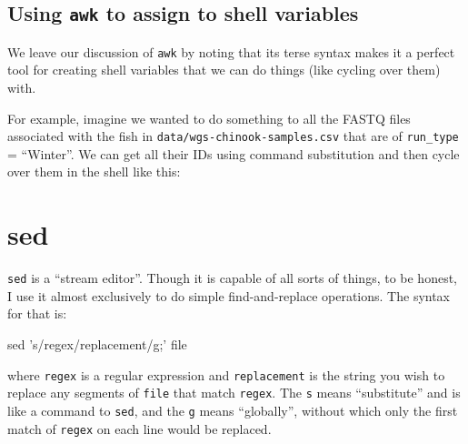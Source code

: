 \documentclass[]{krantz}
\makeatletter
\newenvironment{Shaded}{\begin{snugshade}}{\end{snugshade}}
\newcommand{\BuiltInTok}[1]{#1}
\newcommand{\ExtensionTok}[1]{#1}
\newcommand{\FunctionTok}[1]{\textcolor[rgb]{0,0,0}{#1}}
\newcommand{\KeywordTok}[1]{\textcolor[rgb]{0.27,0.27,0.27}{\textbf{#1}}}
\newcommand{\NormalTok}[1]{#1}
\newcommand{\StringTok}[1]{\textcolor[rgb]{0.5,0.5,0.5}{#1}}
\newcommand{\VariableTok}[1]{\textcolor[rgb]{0,0,0}{#1}}
\newenvironment{kframe}{%
\medskip{}
\setlength{\fboxsep}{.8em}
 \def\at@end@of@kframe{}%
 \ifinner\ifhmode%
  \def\at@end@of@kframe{\end{minipage}}%
  \begin{minipage}{\columnwidth}%
 \fi\fi%
 \def\FrameCommand##1{\hskip\@totalleftmargin \hskip-\fboxsep
 \colorbox{shadecolor}{##1}\hskip-\fboxsep
     \hskip-\linewidth \hskip-\@totalleftmargin \hskip\columnwidth}%
 \MakeFramed {\advance\hsize-\width
   \@totalleftmargin\z@ \linewidth\hsize
   \@setminipage}}%
 {\par\unskip\endMakeFramed%
 \at@end@of@kframe}
\renewenvironment{Shaded}{\begin{kframe}}{\end{kframe}}
\makeatother
\begin{document}
\hypertarget{using-awk-to-assign-to-shell-variables}{%
\subsection{\texorpdfstring{Using \texttt{awk} to assign to shell variables}{Using awk to assign to shell variables}}\label{using-awk-to-assign-to-shell-variables}}

We leave our discussion of \texttt{awk} by noting that its terse syntax makes it
a perfect tool for creating shell variables that we can do things (like
cycling over them) with.

For example, imagine we wanted to do something to all the FASTQ files associated with
the fish in \texttt{data/wgs-chinook-samples.csv} that are of \texttt{run\_type} = ``Winter''. We can
get all their IDs using command substitution and then cycle over them in the shell like this:

\begin{Shaded}
\end{Shaded}

\hypertarget{sed}{%
\section{sed}\label{sed}}

\texttt{sed} is a ``stream editor''. Though it is capable of all sorts of things,
to be honest, I use it almost exclusively to
do simple find-and-replace operations. The syntax for that is:

\begin{Shaded}
\begin{Highlighting}[]
\FunctionTok{sed} \StringTok{'s/regex/replacement/g;'}\NormalTok{ file}
\end{Highlighting}
\end{Shaded}

where \texttt{regex} is a regular expression and \texttt{replacement} is the string you wish to replace
any segments of \texttt{file} that match \texttt{regex}. The \texttt{s} means ``substitute'' and is like
a command to \texttt{sed}, and the \texttt{g} means ``globally'', without which only the first
match of \texttt{regex} on each line would be replaced.
\end{document}
